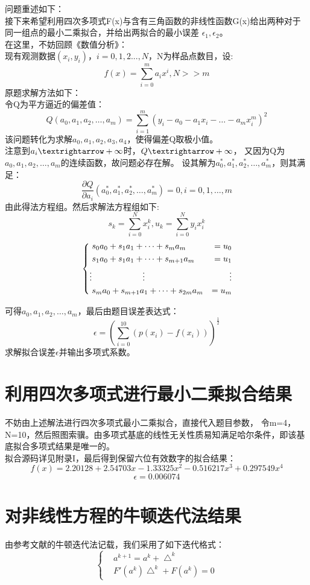 \documentclass[UTF8]{ctexart}
\begin{document}
问题重述如下：\\
接下来希望利用四次多项式F(x)与含有三角函数的非线性函数G(x)给出两种对于同一组点的最小二乘拟合，并给出两拟合的最小误差
$\epsilon_{1},\epsilon_{2}$。\\
在这里，不妨回顾《数值分析》：\\
现有观测数据$(x_{i},y_{i})$，$i = 0,1,2...,N$，N为样品点数目，设:
$$f(x)=\sum^{m}_{i=0}a_{i}x^{i},N>>m$$
原题求解方法如下：\\
令Q为平方逼近的偏差值：\\
$$Q(a_{0},a_{1},a_{2},\dots,a_{m})=\sum^{m}_{i=1}(y_{i}-a_{0}-a_{1}x_{i}-\dots-a_{m}x_{i}^{m})^{2}$$
该问题转化为求解$a_{0},a_{1},a_{2},a_{3},a_{4}$，使得偏差Q取极小值。\\
注意到$a_{i}\textrightarrow+\infty$时，$Q\textrightarrow+\infty$，
又因为Q为$a_{0},a_{1},a_{2},\dots,a_{m}$的连续函数，故问题必存在解。
设其解为$a_{0}^{*},a_{1}^{*},a_{2}^{*},\dots,a_{m}^{*}$，则其满足：
$$\frac{\partial Q}{\partial a_{i}}(a_{0}^{*},a_{1}^{*},a_{2}^{*},\dots,a_{m}^{*}) = 0,i=0,1,\dots,m$$
由此得法方程组。然后求解法方程组如下:
\[
s_{k}=\sum_{i=0}^{N}x_{i}^{k},u_{k}=\sum_{i=0}^{N}y_{i}x_{i}^{k}
\]
\[
\\
\left\{
\begin{aligned}
	&s_{0}a_{0}+s_{1}a_{1}+\dots+s_{m}a_{m}  &=u_{0}\\
	&s_{1}a_{0}+s_{1}a_{1}+\dots+s_{m+1}a_{m}&=u_{1}\\
	\vdots&\qquad\qquad\qquad\vdots&\vdots\\
	&s_{m}a_{0}+s_{m+1}a_{1}+\dots+s_{2m}a_{m}&=u_{m}\\
\end{aligned}
\right.
\]


可得$a_{0},a_{1},a_{2},\dots,a_{m}$，最后由题目误差表达式：
$$\epsilon=(\sum_{i=0}^{10}(p(x_i)-f(x_{i})))^{\frac{1}{2}}$$
求解拟合误差$\epsilon$并输出多项式系数。


\section{利用四次多项式进行最小二乘拟合结果}
不妨由上述解法进行四次多项式最小二乘拟合，直接代入题目参数，
令m=4，N=10，然后照图索骥。由多项式基底的线性无关性质易知满足哈尔条件，即该基底拟合多项式结果是唯一的。\\
拟合源码详见附录I，最后得到保留六位有效数字的拟合结果：
$$f(x)=2.20128+2.54703x-1.33325x^{2}-0.516217x^{3}+0.297549x^{4}$$
$$\epsilon=0.006074$$

\section{对非线性方程的牛顿迭代法结果}
由参考文献\cite{Yan2004}的牛顿迭代法记载，我们采用了如下迭代格式：
\[
\left\{
\begin{aligned}
	&a^{k+1}=a^{k}+\bigtriangleup^{k}
	\\
	&F'(a^{k}) \bigtriangleup^{k} + F(a^{k})=0
\end{aligned}
\right.
\]         
\end{document}
